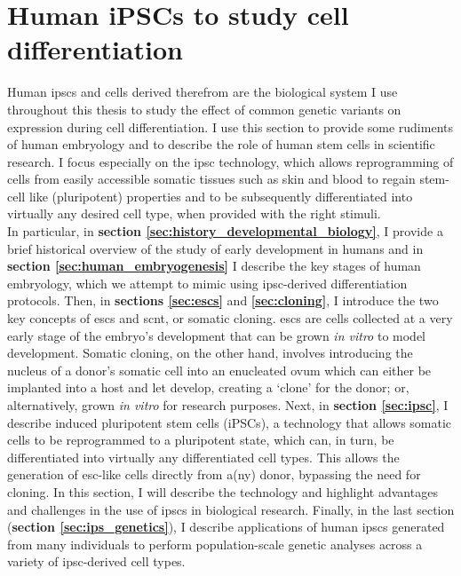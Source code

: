 \section{Human iPSCs to study cell differentiation}  %
\label{sec:human_ipscs}  

Human \glspl{ipsc} and cells derived therefrom are the biological system I use throughout this thesis to study the effect of common genetic variants on expression during cell differentiation.
I use this section to provide some rudiments of human embryology and to describe the role of human stem cells in scientific research.
I focus especially on the \gls{ipsc} technology, which allows reprogramming of cells from easily accessible somatic tissues such as skin and blood to regain stem-cell like (pluripotent) properties and to be subsequently differentiated into virtually any desired cell type, when provided with the right stimuli.\\

In particular, in \textbf{section \ref{sec:history_developmental_biology}}, I provide a brief historical overview of the study of early development in humans and in \textbf{section \ref{sec:human_embryogenesis}} I describe the key stages of human embryology, which we attempt to mimic using \gls{ipsc}-derived differentiation protocols.
Then, in \textbf{sections \ref{sec:escs}} and \textbf{\ref{sec:cloning}}, I introduce the two key concepts of \glspl{esc} and \gls{scnt}, or somatic cloning.
\glspl{esc} are cells collected at a very early stage of the embryo's development that can be grown \textit{in vitro} to model development.
Somatic cloning, on the other hand, involves introducing the nucleus of a donor's somatic cell into an enucleated ovum which can either be implanted into a host and let develop, creating a `clone' for the donor; or, alternatively, grown \textit{in vitro} for research purposes.
Next, in \textbf{section \ref{sec:ipsc}}, I describe induced pluripotent stem cells (iPSCs), a technology that allows somatic cells to be reprogrammed to a pluripotent state, which can, in turn, be differentiated into virtually any differentiated cell types.
This allows the generation of \gls{esc}-like cells directly from a(ny) donor, bypassing the need for cloning. 
In this section, I will describe the technology and highlight advantages and challenges in the use of \glspl{ipsc} in biological research.
Finally, in the last section (\textbf{section \ref{sec:ips_genetics}}), I describe 
applications of human \glspl{ipsc} generated from many individuals to perform population-scale genetic analyses across a variety of \gls{ipsc}-derived cell types.

